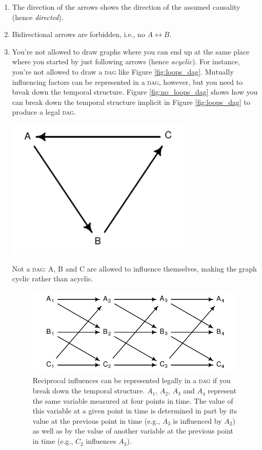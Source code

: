 \documentclass[a4paper]{tufte-book}\usepackage[]{graphicx}\usepackage[]{xcolor}
\begin{document}
\begin{enumerate}
  \item The direction of the arrows shows the direction of the assumed causality (hence \emph{directed}).

  \item Bidirectional arrows are forbidden, i.e., no $A \leftrightarrow B$.

  \item You're not allowed to draw graphs where you can end up at the same place where you started by just following arrows (hence \emph{acyclic}).
  For instance, you're not allowed to draw a \textsc{dag} like Figure \ref{fig:loops_dag}.
  Mutually influencing factors can be represented in a \textsc{dag}, however, but you need to
  break down the temporal structure. Figure \vref{fig:no_loops_dag} shows how you
  can break down the temporal structure implicit in Figure \ref{fig:loops_dag}
  to produce a legal \textsc{dag}.

\begin{marginfigure}[-3cm]
\centering
\includegraphics[width=0.7\textwidth]{figure/loops_dag}
\caption[Not a \textsc{dag}.]{Not a \textsc{dag}: A, B and C are allowed to influence themselves, making the graph cyclic rather than acyclic.}
\label{fig:loops_dag}
\end{marginfigure}



\begin{figure}
\includegraphics[width=\textwidth]{figure/no_loops_dag}
\caption{Reciprocal influences can be represented legally in a \textsc{dag} if you break down the temporal structure. $A_1$, $A_2$, $A_3$ and $A_4$ represent the same variable measured at four points in time. The value of this variable at a given point in time is determined in part by its value at the previous point in time (e.g., $A_3$ is influenced by $A_2$) as well as by the value of another variable at the previous point in time (e.g., $C_2$ influences $A_3$).}
\label{fig:no_loops_dag}
\end{figure}


\end{enumerate}
\end{document}
